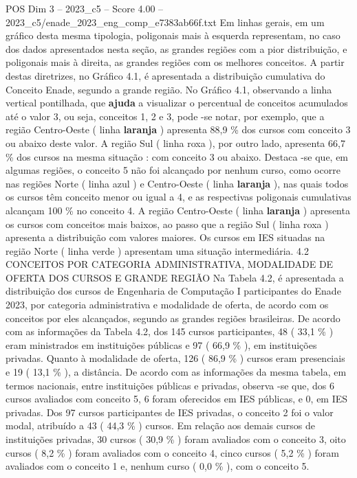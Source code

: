\begin{textsample}{POS Dim 3 – 2023\_c5 – Score 4.00 – 2023\_c5/enade\_2023\_eng\_comp\_e7383ab66f.txt}
Em linhas gerais, em um gráfico desta mesma tipologia, poligonais mais à esquerda representam, no caso dos dados apresentados nesta seção, as grandes regiões com a pior distribuição, e poligonais mais à direita, as grandes regiões com os melhores conceitos.
A partir destas diretrizes, no Gráfico 4.1, é apresentada a distribuição cumulativa do Conceito Enade, segundo a grande região.
No Gráfico 4.1, observando a linha vertical pontilhada, que \textbf{ajuda} a visualizar o percentual de conceitos acumulados até o valor 3, ou seja, conceitos 1, 2 e 3, pode -se notar, por exemplo, que a região Centro-Oeste ( linha \textbf{laranja} ) apresenta 88,9 \% dos cursos com conceito 3 ou abaixo deste valor.
A região Sul ( linha roxa ), por outro lado, apresenta 66,7 \% dos cursos na mesma situação : com conceito 3 ou abaixo.
Destaca -se que, em algumas regiões, o conceito 5 não foi alcançado por nenhum curso, como ocorre nas regiões Norte ( linha azul ) e Centro-Oeste ( linha \textbf{laranja} ), nas quais todos os cursos têm conceito menor ou igual a 4, e as respectivas poligonais cumulativas alcançam 100 \% no conceito 4.
A região Centro-Oeste ( linha \textbf{laranja} ) apresenta os cursos com conceitos mais baixos, ao passo que a região Sul ( linha roxa ) apresenta a distribuição com valores maiores.
Os cursos em IES situadas na região Norte ( linha verde ) apresentam uma situação intermediária. 4.2 CONCEITOS POR CATEGORIA ADMINISTRATIVA, MODALIDADE DE OFERTA DOS CURSOS E GRANDE REGIÃO Na Tabela 4.2, é apresentada a distribuição dos cursos de Engenharia de Computação I participantes do Enade 2023, por categoria administrativa e modalidade de oferta, de acordo com os conceitos por eles alcançados, segundo as grandes regiões brasileiras.
De acordo com as informações da Tabela 4.2, dos 145 cursos participantes, 48 ( 33,1 \% ) eram ministrados em instituições públicas e 97 ( 66,9 \% ), em instituições privadas.
Quanto à modalidade de oferta, 126 ( 86,9 \% ) cursos eram presenciais e 19 ( 13,1 \% ), a distância.
De acordo com as informações da mesma tabela, em termos nacionais, entre instituições públicas e privadas, observa -se que, dos 6 cursos avaliados com conceito 5, 6 foram oferecidos em IES públicas, e 0, em IES privadas.
Dos 97 cursos participantes de IES privadas, o conceito 2 foi o valor modal, atribuído a 43 ( 44,3 \% ) cursos.
Em relação aos demais cursos de instituições privadas, 30 cursos ( 30,9 \% ) foram avaliados com o conceito 3, oito cursos ( 8,2 \% ) foram avaliados com o conceito 4, cinco cursos ( 5,2 \% ) foram avaliados com o conceito 1 e, nenhum curso ( 0,0 \% ), com o conceito 5.

\end{textsample}
